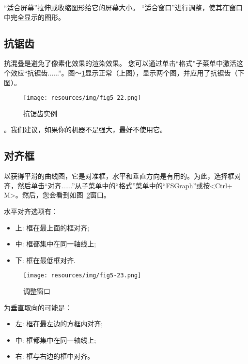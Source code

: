 \noindent “适合屏幕”拉伸或收缩图形给它的屏幕大小。 “适合窗口”进行调整，使其在窗口中完全显示的图形。

\subsection{抗锯齿}
抗混叠是避免了像素化效果的渲染效果。
您可以通过单击“格式”子菜单中激活这个效应“抗锯齿......”。图〜\ref{fig-antialiasing}显示正常（上图），显示两个图，并应用了抗锯齿（下图）。


\bigskip
\begin{figure}[!ht]
\begin{center}
\texttt{[image: resources/img/fig5-22.png]}
\caption{抗锯齿实例\label{fig-antialiasing}}
\end{center}
\end{figure}

。我们建议，如果你的机器不是强大，最好不使用它。



\subsection{对齐框}
以获得平滑的曲线图，它是对准框，水平和垂直方向是有用的。为此，选择框对齐，然后单击“对齐......”从子菜单中的“格式”菜单中的“FSGraph”或按<Ctrl+ M>。然后，您会看到如图~\ref{fig-alignment-frame}窗口。

\bigskip
\noindent 水平对齐选项有：
\begin{itemize}
  \item 上: 框在最上面的框对齐;
  \item 中: 框都集中在同一轴线上;
  \item 下: 框在最低框对齐.
\end{itemize}

\begin{figure}[!h]
\begin{center}
\texttt{[image: resources/img/fig5-23.png]}
\caption{调整窗口\label{fig-alignment-frame}}
\end{center}
\end{figure}

\noindent 为垂直取向的可能是：
\begin{itemize}
  \item 左: 框在最左边的方框内对齐;
  \item 中: 框都集中在同一轴线上;
  \item 右: 框与右边的框中对齐。
\end{itemize}

